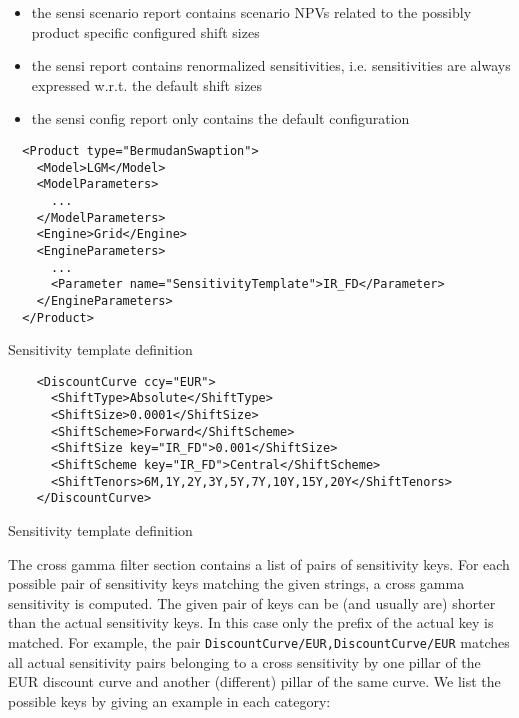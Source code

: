 \begin{itemize}
\item the sensi scenario report contains scenario NPVs related to the possibly product specific configured shift sizes
\item the sensi report contains renormalized sensitivities, i.e. sensitivities are always expressed w.r.t. the default shift sizes
\item the sensi config report only contains the default configuration
\end{itemize}

\begin{longlisting}
\begin{verbatim}
  <Product type="BermudanSwaption">
    <Model>LGM</Model>
    <ModelParameters>
      ...
    </ModelParameters>
    <Engine>Grid</Engine>
    <EngineParameters>
      ...
      <Parameter name="SensitivityTemplate">IR_FD</Parameter>
    </EngineParameters>
  </Product>
\end{verbatim}
\caption{Sensitivity template definition}
\label{lst:sensi_template}
\end{longlisting}
\begin{longlisting}
\begin{verbatim}
    <DiscountCurve ccy="EUR">
      <ShiftType>Absolute</ShiftType>
      <ShiftSize>0.0001</ShiftSize>
      <ShiftScheme>Forward</ShiftScheme>
      <ShiftSize key="IR_FD">0.001</ShiftSize>
      <ShiftScheme key="IR_FD">Central</ShiftScheme>
      <ShiftTenors>6M,1Y,2Y,3Y,5Y,7Y,10Y,15Y,20Y</ShiftTenors>
    </DiscountCurve>
\end{verbatim}
\caption{Sensitivity template definition}
\label{lst:sensi_config_template}
\end{longlisting}

The cross gamma filter section contains a list of pairs of sensitivity keys. For each possible pair of sensitivity keys
matching the given strings, a cross gamma sensitivity is computed. The given pair of keys can be (and usually are)
shorter than the actual sensitivity keys. In this case only the prefix of the actual key is matched. For example, the
pair {\tt DiscountCurve/EUR,DiscountCurve/EUR} matches all actual sensitivity pairs belonging to a cross sensitivity by
one pillar of the EUR discount curve and another (different) pillar of the same curve. We list the possible keys by
giving an example in each category:


